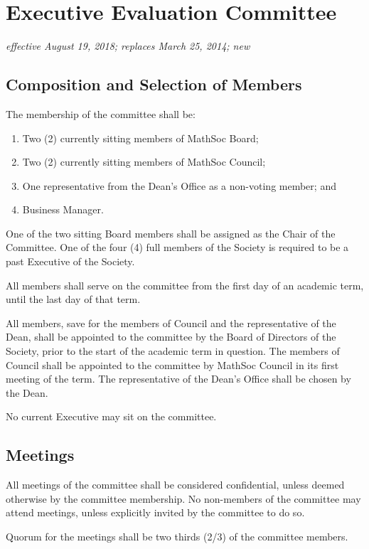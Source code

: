 \section{Executive Evaluation Committee}
\emph{effective August 19, 2018; replaces March 25, 2014; new}\\

\subsection{Composition and Selection of Members}
The membership of the committee shall be:
\begin{enumerate}
    \item Two (2) currently sitting members of MathSoc Board;
    \item Two (2) currently sitting members of MathSoc Council;
    \item One representative from the Dean's Office as a non-voting member; and
    \item Business Manager.
\end{enumerate}

One of the two sitting Board members shall be assigned as the Chair of the Committee.
One of the four (4) full members of the Society is required to be a past Executive of the Society.
 
All members shall serve on the committee from the first day of an academic
term, until the last day of that term.

All members, save for the members of Council and the representative of the
Dean, shall be appointed to the committee by the Board of Directors of the
Society, prior to the start of the academic term in question. The members of
Council shall be appointed to the committee by MathSoc Council in its first
meeting of the term. The representative of the Dean's Office shall be chosen by
the Dean.

No current Executive may sit on the committee.

\subsection{Meetings}

All meetings of the committee shall be considered confidential, unless deemed
otherwise by the committee membership. No non-members of the committee may
attend meetings, unless explicitly invited by the committee to do so.

Quorum for the meetings shall be two thirds (2/3) of the committee members.

